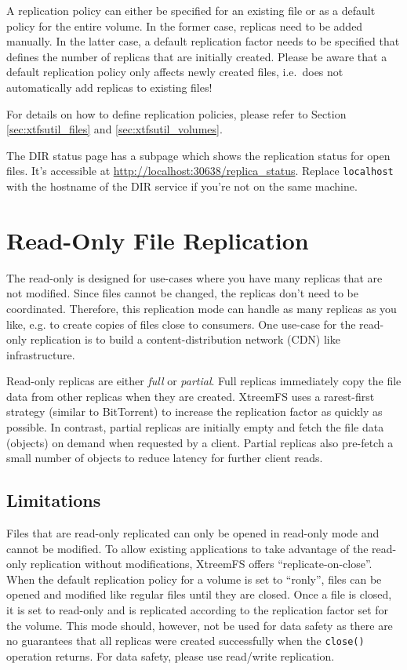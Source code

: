 \documentclass[a4paper,10pt]{book}
\begin{document}
A replication policy can either be specified for an existing file or as a default policy for the entire volume. In the former case, replicas need to be added manually. In the latter case, a default replication factor needs to be specified that defines the number of replicas that are initially created. Please be aware that a default replication policy only affects newly created files, i.e.\ does not automatically add replicas to existing files!

For details on how to define replication policies, please refer to Section \ref{sec:xtfsutil_files} and \ref{sec:xtfsutil_volumes}.

The DIR status page has a subpage which shows the replication status for open files. It's accessible at \url{http://localhost:30638/replica_status}. Replace \texttt{localhost} with the hostname of the DIR service if you're not on the same machine.

\section{Read-Only File Replication}
\label{sec:ronly_replication}
The read-only is designed for use-cases where you have many replicas that are not modified. Since files cannot be changed, the replicas don't need to be coordinated. Therefore, this replication mode can handle as many replicas as you like, e.g. to create copies of files close to consumers. One use-case for the read-only replication is to build a content-distribution network (CDN) like infrastructure.

Read-only replicas are either \textit{full} or \textit{partial}. Full replicas immediately copy the file data from other replicas when they are created. XtreemFS uses a rarest-first strategy (similar to BitTorrent) to increase the replication factor as quickly as possible. In contrast, partial replicas are initially empty and fetch the file data (objects) on demand when requested by a client. Partial replicas also pre-fetch a small number of objects to reduce latency for further client reads.

\subsection{Limitations}
Files that are read-only replicated can only be opened in read-only mode and cannot be modified. To allow existing applications to take advantage of the read-only replication without modifications, XtreemFS offers ``replicate-on-close''. When the default replication policy for a volume is set to ``ronly'', files can be opened and modified like regular files until they are closed. Once a file is closed, it is set to read-only and is replicated according to the replication factor set for the volume. This mode should, however, not be used for data safety as there are no guarantees that all replicas were created successfully when the \texttt{close()} operation returns. For data safety, please use read/write replication.
\end{document}
